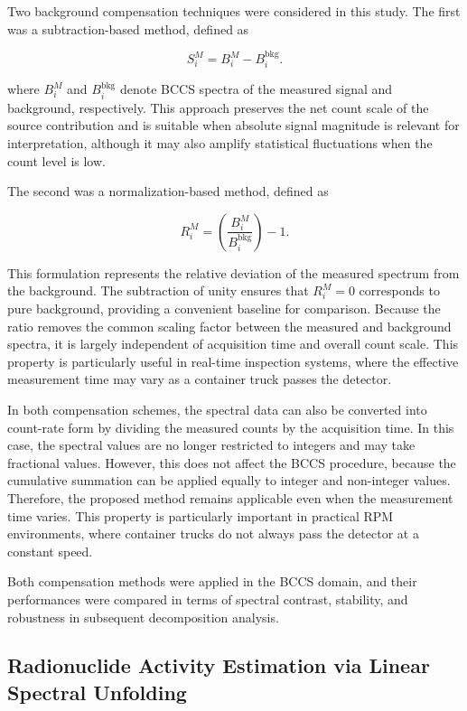 \documentclass[fleqn, 10pt]{wlscirep}
\begin{document}
Two background compensation techniques were considered in this study. The first was a subtraction-based method, defined as 

\begin{equation}
S^M_i =  B^M_i - B_i^{\textrm{bkg}}. \label{eq:DS}
\end{equation}

where $B_i^M$ and $B_i^\text{bkg}$ denote BCCS spectra of the measured signal and background, respectively. This approach preserves the net count scale of the source contribution and is suitable when absolute signal magnitude is relevant for interpretation, although it may also amplify statistical fluctuations when the count level is low.

The second was a normalization-based method, defined as 

\begin{equation}
R^M_i = \left(\dfrac{B^M_i}{B^{\textrm{bkg}}_i}\right) -1.\label{eq:NB}
\end{equation}

This formulation represents the relative deviation of the measured spectrum from the background. The subtraction of unity ensures that 
$R_i^M = 0$ corresponds to pure background, providing a convenient baseline for comparison. Because the ratio removes the common scaling factor between the measured and background spectra, it is largely independent of acquisition time and overall count scale. This property is particularly useful in real-time inspection systems, where the effective measurement time may vary as a container truck passes the detector.


In both compensation schemes, the spectral data can also be converted into count-rate form by dividing the measured counts by the acquisition time. In this case, the spectral values are no longer restricted to integers and may take fractional values. However, this does not affect the BCCS procedure, because the cumulative summation can be applied equally to integer and non-integer values. Therefore, the proposed method remains applicable even when the measurement time varies. This property is particularly important in practical RPM environments, where container trucks do not always pass the detector at a constant speed.

Both compensation methods were applied in the BCCS domain, and their performances were compared in terms of spectral contrast, stability, and robustness in subsequent decomposition analysis.

\subsection*{Radionuclide Activity Estimation via Linear Spectral Unfolding}
\end{document}
